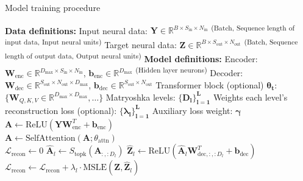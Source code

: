 \begin{algorithm}[h!]
\caption{Model training procedure}
\label{algorithm:sdnn_model_training}
\begin{algorithmic}[1]
\State \textbf{Data definitions:}
\State \quad Input neural data: $\mathbf{Y} \in \mathbb{R}^{B \times S_{\text{in}} \times N_{\text{in}}}$ \textsuperscript{(Batch, Sequence length of input data, Input neural units)}
\State \quad Target neural data: $\mathbf{Z} \in \mathbb{R}^{B \times S_{\text{out}} \times N_{\text{out}}}$ \textsuperscript{(Batch, Sequence length of output data, Output neural units)}
\State \textbf{Model definitions:}
\State \quad Encoder: $\mathbf{W}_{\text{enc}} \in \mathbb{R}^{D_{\text{max}} \times S_{\text{in}} \times N_{\text{in}}}$, $\mathbf{b}_{\text{enc}} \in \mathbb{R}^{D_{\text{max}}}$ \textsuperscript{(Hidden layer neurons)}
\State \quad Decoder: $\mathbf{W}_{\text{dec}} \in \mathbb{R}^{S_{\text{out}} \times N_{\text{out}} \times D_{\text{max}}}$, $\mathbf{b}_{\text{dec}} \in \mathbb{R}^{S_{\text{out}} \times N_{\text{out}}}$
\State \quad Transformer block (optional) $\mathbf{\theta_{t}}$: $\{\mathbf{W}_{Q,K,V} \in \mathbb{R}^{D_{\max} \times D_{\max}}, \dots\}$
\State \quad Matryoshka levels: $\mathbf{\{D_l\}_{l=1}^L}$
\State \quad Weights each level's reconstruction loss (optional): $\mathbf{\{\lambda_l\}_{l=1}^L}$
\State \quad Auxiliary loss weight: $\mathbf{\gamma}$
\\
    \Statex {}
    \State $\mathbf{A} \gets \text{ReLU}(\mathbf{Y}\mathbf{W}_{\text{enc}}^T + \mathbf{b}_{\text{enc}})$ 
    \\
        \State $\mathbf{A} \gets \text{SelfAttention}(\mathbf{A}; \theta_{\text{attn}})$ 
    \EndIf
    \\
    \State $\mathcal{L}_{\text{recon}} \gets 0$
     
        \State $\hat{\mathbf{A}}_l \gets S_{\text{topk}}(\mathbf{A}_{:, :D_l})$ 
        \State $\hat{\mathbf{Z}}_l \gets \text{ReLU}(\hat{\mathbf{A}}_l \mathbf{W}_{\text{dec}, :, :D_l}^T + \mathbf{b}_{\text{dec}})$ 
        \State $\mathcal{L}_{\text{recon}} \gets \mathcal{L}_{\text{recon}} + \lambda_l \cdot \text{MSLE}(\mathbf{Z}, \hat{\mathbf{Z}}_l)$ 
    \EndFor
    

\end{algorithmic}
\end{algorithm}
